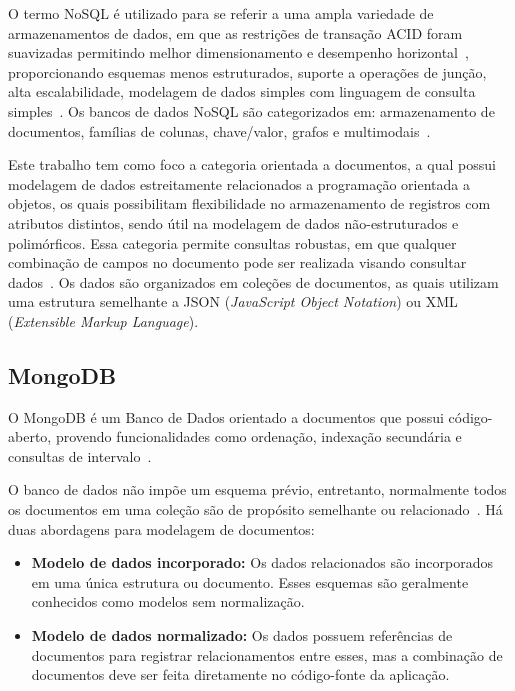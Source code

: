 \documentclass[12pt]{article}
\begin{document}
O termo NoSQL é utilizado para se referir a uma ampla variedade de armazenamentos de dados, em que as restrições de transação ACID foram suavizadas permitindo melhor dimensionamento e desempenho horizontal~\cite{rafique:2018}, proporcionando esquemas menos estruturados, suporte a operações de junção, alta escalabilidade, modelagem de dados simples com linguagem de consulta simples~\cite{ramesh:2016}. 
Os bancos de dados NoSQL são categorizados em: armazenamento de documentos, famílias de colunas, chave/valor, grafos e multimodais~\cite{aparicio:2016}.


Este trabalho tem como foco a categoria orientada a documentos, a qual possui modelagem de dados estreitamente relacionados a programação orientada a objetos, os quais possibilitam flexibilidade no armazenamento de registros  com atributos distintos, sendo útil na modelagem de dados não-estruturados e polimórficos. 
Essa categoria permite consultas robustas, em que qualquer combinação de campos no documento pode ser realizada visando consultar dados~\cite{patil:2017}. 
Os dados são organizados em coleções de documentos, as quais utilizam uma estrutura semelhante a JSON (\emph{JavaScript Object Notation}) ou XML (\emph{Extensible Markup Language}).

\subsection{MongoDB}

O MongoDB é um Banco de Dados orientado a documentos que possui código-aberto, provendo funcionalidades como ordenação, indexação secundária e consultas de intervalo~\cite{membrey2011definitive}.

O banco de dados não impõe um esquema prévio, entretanto, normalmente todos os documentos em uma coleção são de propósito semelhante ou relacionado~\cite{kanade2014study,lutu2015big}. Há duas abordagens para modelagem de documentos:

\begin{itemize}
\item \textbf{Modelo de dados incorporado:} Os dados relacionados são incorporados em uma única estrutura ou documento. Esses esquemas são geralmente conhecidos como modelos sem normalização. %
\item \textbf{Modelo de dados normalizado:} Os dados possuem referências de documentos para registrar relacionamentos entre esses, mas a combinação de documentos deve ser feita diretamente no código-fonte da aplicação. %
\end{itemize}
\end{document}
